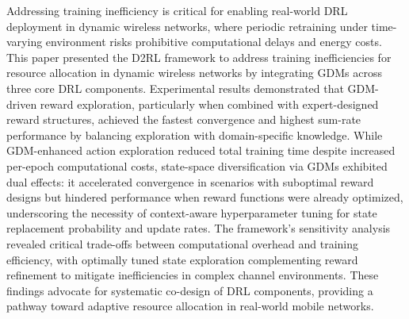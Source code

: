 \documentclass[comsoc,journal]{IEEEtran}
\begin{document}
Addressing training inefficiency is critical for enabling real-world DRL deployment in dynamic wireless networks, where periodic retraining under time-varying environment risks prohibitive computational delays and energy costs. This paper presented the D2RL framework to address training inefficiencies for resource allocation in dynamic wireless networks by integrating GDMs across three core DRL components. Experimental results demonstrated that GDM-driven reward exploration, particularly when combined with expert-designed reward structures, achieved the fastest convergence and highest sum-rate performance by balancing exploration with domain-specific knowledge. While GDM-enhanced action exploration reduced total training time despite increased per-epoch computational costs, state-space diversification via GDMs exhibited dual effects: it accelerated convergence in scenarios with suboptimal reward designs but hindered performance when reward functions were already optimized, underscoring the necessity of context-aware hyperparameter tuning for state replacement probability and update rates. The framework’s sensitivity analysis revealed critical trade-offs between computational overhead and training efficiency, with optimally tuned state exploration complementing reward refinement to mitigate inefficiencies in complex channel environments. These findings advocate for systematic co-design of DRL components, providing a pathway toward adaptive resource allocation in real-world mobile networks. 
 


\end{document}
